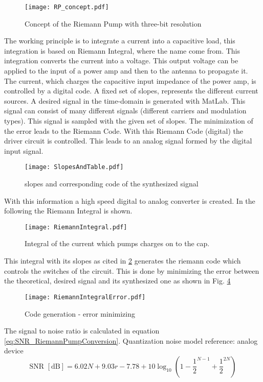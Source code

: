 \begin{figure}[ht]
	\centering
  \texttt{[image: RP\_concept.pdf]}
	\caption{Concept of the Riemann Pump with three-bit resolution}
	\label{fig:RiemannPumpConcept}
\end{figure}

 The working principle is to integrate a current into a capacitive load, this integration is based on Riemann Integral, where the name come from. This integration converts the current into a voltage. This output voltage can be applied to the input of a power amp and then to the antenna to propagate it. The current, which charges the capacitive input impedance of the power amp, is controlled by a digital code. A fixed set of slopes, represents the different current sources. A desired signal in the time-domain is generated with MatLab. This signal can consist of many different signals (different carriers and modulation types). This signal is sampled with the given set of slopes. The minimization of the error leads to the Riemann Code. With this Riemann Code (digital) the driver circuit is controlled. This leads to an analog signal formed by the digital input signal. 
 
\begin{figure}[ht]
	\centering
  \texttt{[image: SlopesAndTable.pdf]}
	\caption{slopes and corresponding code of the synthesized signal}
	\label{fig:SlopesAndTable}
\end{figure}

With this information a high speed digital to analog converter is created. In the following the Riemann Integral is shown.

\begin{figure}[ht]
	\centering
  \texttt{[image: RiemannIntegral.pdf]}
	\caption{Integral of the current which pumps charges on to the cap.}
	\label{fig:RiemannIntegral}
\end{figure}
This integral with its slopes as cited in \ref{fig:SlopesAndTable} generates the riemann code which controls the switches of the circuit. This is done by minimizing the error between the theoretical, desired signal and its synthesized one as shown in Fig. \ref{fig:RiemannIntegralError}
 \begin{figure}[ht]
	\centering
  \texttt{[image: RiemannIntegralError.pdf]}
	\caption{Code generation - error minimizing}
	\label{fig:RiemannIntegralError}
\end{figure}
The signal to noise ratio is calculated in equation \ref{eq:SNR_RiemannPumpConversion}. Quantization noise model {reference: analog device}
\begin{equation}
	\text{SNR } [\si{\dB}] = 6.02N + 9.03r - 7.78 + 10\log_{10}(1 - \frac{1}{2}^{N-1} + \frac{1}{2}^{2N})
	\label{eq:SNR_RiemannPumpConversion}
\end{equation}

